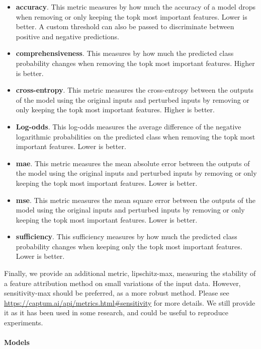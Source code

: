 \begin{itemize}
    \item \textbf{accuracy}.
        This metric measures by how much the accuracy of a model drops when
        removing or only keeping the topk most important features.
        Lower is better.
        A custom threshold can also be passed to discriminate between positive and negative predictions.
    \item \textbf{comprehensiveness}.
        This measures by how much the predicted class probability changes when removing the topk most important
        features.
        Higher is better.
    \item \textbf{cross-entropy}.
        This metric measures the cross-entropy between the outputs of the model using the original inputs and perturbed
        inputs by removing or only keeping the topk most important features.
        Higher is better.
    \item \textbf{Log-odds}.
        This log-odds measures the average difference of the negative logarithmic probabilities on the predicted class
        when removing the topk most important features.
        Lower is better.
    \item \textbf{mae}.
        This metric measures the mean absolute error between the outputs of the model using the original inputs and
        perturbed inputs by removing or only keeping the topk most important features.
        Lower is better.
    \item \textbf{mse}.
        This metric measures the mean square error between the outputs of the model using the original inputs and
        perturbed inputs by removing or only keeping the topk most important features.
        Lower is better.
    \item \textbf{sufficiency}.
        This sufficiency measures by how much the predicted class probability changes when keeping only the topk most
        important features.
        Lower is better.
\end{itemize}

Finally, we provide an additional metric, lipschitz-max, measuring the stability of a feature attribution method
on small variations of the input data.
However, sensitivity-max should be preferred, as a more robust method.
Please see \url{https://captum.ai/api/metrics.html#sensitivity} for more details.
We still provide it as it has been used in some research, and could be useful to reproduce experiments.


\paragraph{Models}

